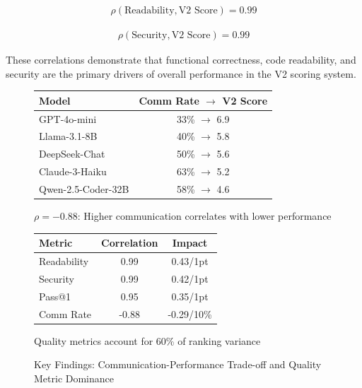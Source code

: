 \documentclass[conference]{IEEEtran}
\begin{document}
\begin{align}
\rho(\text{Readability}, \text{V2 Score}) = 0.99
\end{align}

\begin{align}
\rho(\text{Security}, \text{V2 Score}) = 0.99
\end{align}

These correlations demonstrate that functional correctness, code readability, and security are the primary drivers of overall performance in the V2 scoring system.

\begin{figure}[ht]
    \centering
    \begin{minipage}{0.45\textwidth}
        \centering
        \small
        \caption{Communication Rate vs V2 Score Trade-off}
        \label{fig:comm_tradeoff}
        \begin{tabular}{lc}
            \toprule
            Model & Comm Rate $\rightarrow$ V2 Score \\
            \midrule
            GPT-4o-mini & 33\% $\rightarrow$ 6.9 \\
            Llama-3.1-8B & 40\% $\rightarrow$ 5.8 \\
            DeepSeek-Chat & 50\% $\rightarrow$ 5.6 \\
            Claude-3-Haiku & 63\% $\rightarrow$ 5.2 \\
            Qwen-2.5-Coder-32B & 58\% $\rightarrow$ 4.6 \\
            \bottomrule
        \end{tabular}
        \vspace{0.5em}
        {\small $\rho = -0.88$: Higher communication correlates with lower performance}
    \end{minipage}
    \hfill
    \begin{minipage}{0.45\textwidth}
        \centering
        \small
        \caption{Code Quality Dominance in Rankings}
        \label{fig:quality_dominance}
        \begin{tabular}{lcc}
            \toprule
            Metric & Correlation & Impact \\
            \midrule
            Readability & 0.99 & 0.43/1pt \\
            Security & 0.99 & 0.42/1pt \\
            Pass@1 & 0.95 & 0.35/1pt \\
            Comm Rate & -0.88 & -0.29/10\% \\
            \bottomrule
        \end{tabular}
        \vspace{0.5em}
        {\small Quality metrics account for 60\% of ranking variance}
    \end{minipage}
    \caption{Key Findings: Communication-Performance Trade-off and Quality Metric Dominance}
    \label{fig:key_findings}
\end{figure}
\end{document}
